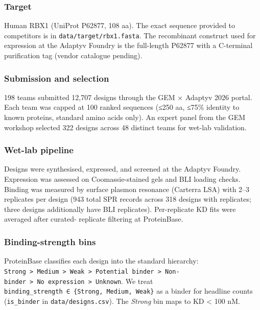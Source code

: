 \subsubsection{Target}\label{target}

Human RBX1 (UniProt P62877, 108 aa). The exact sequence provided to
competitors is in \texttt{data/target/rbx1.fasta}. The recombinant
construct used for expression at the Adaptyv Foundry is the full-length
P62877 with a C-terminal purification tag (vendor catalogue pending).

\subsubsection{Submission and selection}\label{submission-and-selection}

198 teams submitted 12,707 designs through the GEM × Adaptyv 2026
portal. Each team was capped at 100 ranked sequences (≤250 aa, ≤75\%
identity to known proteins, standard amino acids only). An expert panel
from the GEM workshop selected 322 designs across 48 distinct teams for
wet-lab validation.

\subsubsection{Wet-lab pipeline}\label{wet-lab-pipeline}

Designs were synthesised, expressed, and screened at the Adaptyv
Foundry. Expression was assessed on Coomassie-stained gels and BLI
loading checks. Binding was measured by surface plasmon resonance
(Carterra LSA) with 2--3 replicates per design (943 total SPR records
across 318 designs with replicates; three designs additionally have BLI
replicates). Per-replicate KD fits were averaged after curated-
replicate filtering at ProteinBase.

\subsubsection{Binding-strength bins}\label{binding-strength-bins}

ProteinBase classifies each design into the standard hierarchy:
\texttt{Strong\ \textgreater{}\ Medium\ \textgreater{}\ Weak\ \textgreater{}\ Potential\ binder\ \textgreater{}\ Non-binder\ \textgreater{}\ No\ expression\ \textgreater{}\ Unknown}.
We treat \texttt{binding\_strength\ ∈\ \{Strong,\ Medium,\ Weak\}} as a
binder for headline counts (\texttt{is\_binder} in
\texttt{data/designs.csv}). The \emph{Strong} bin maps to KD \textless{}
100 nM.


